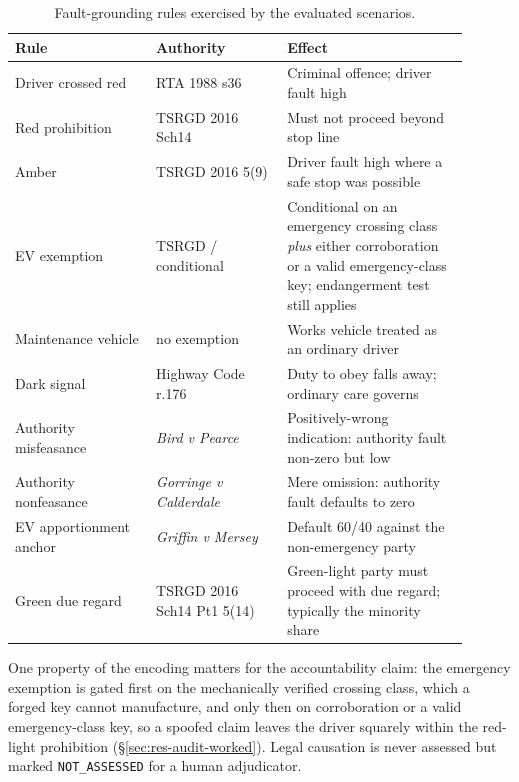 \begin{table}[t]

\centering
\small
\begin{tabular}{p{0.28\linewidth}p{0.26\linewidth}p{0.36\linewidth}}
\toprule
Rule & Authority & Effect \\
\midrule
Driver crossed red & RTA 1988 s36 & Criminal offence; driver fault high \\
Red prohibition & TSRGD 2016 Sch14 & Must not proceed beyond stop line \\
Amber & TSRGD 2016 5(9) & Driver fault high where a safe stop was possible \\
EV exemption & TSRGD / conditional & Conditional on an emergency crossing
class \emph{plus} either corroboration or a valid emergency-class key;
endangerment test still applies \\
Maintenance vehicle & no exemption & Works vehicle treated as an ordinary driver \\
Dark signal & Highway Code r.176 & Duty to obey falls away; ordinary care governs \\
Authority misfeasance & \emph{Bird v Pearce} & Positively-wrong indication:
authority fault non-zero but low \\
Authority nonfeasance & \emph{Gorringe v Calderdale} & Mere omission: authority
fault defaults to zero \\
EV apportionment anchor & \emph{Griffin v Mersey} & Default 60/40 against the
non-emergency party \\
Green due regard & TSRGD 2016 Sch14 Pt1 5(14) & Green-light party must proceed
with due regard; typically the minority share \\
\bottomrule
\end{tabular}
\caption{Fault-grounding rules exercised by the evaluated scenarios.}
\label{tab:uklaw}
\end{table}

One property of the encoding matters for the accountability claim: the
emergency exemption is gated first on the mechanically verified crossing
class, which a forged key cannot manufacture, and only then on
corroboration or a valid emergency-class key, so a spoofed claim leaves
the driver squarely within the red-light prohibition
(\S\ref{sec:res-audit-worked}). Legal causation is never assessed but
marked \texttt{NOT\_ASSESSED} for a human adjudicator.


